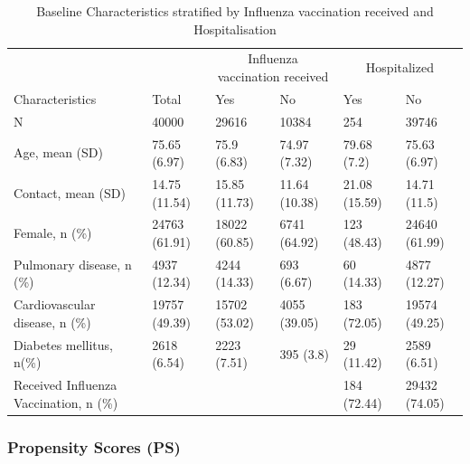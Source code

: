\documentclass[
]{article}
\begin{document}
\begin{table}[!h]

\caption{\label{tab:des}Baseline Characteristics stratified by Influenza vaccination received and Hospitalisation}
\centering
\begin{tabular}[t]{llllll}
\toprule
\multicolumn{1}{c}{ } & \multicolumn{1}{c}{ } & \multicolumn{2}{c}{Influenza vaccination received} & \multicolumn{2}{c}{Hospitalized} \\
\cmidrule(l{3pt}r{3pt}){3-4} \cmidrule(l{3pt}r{3pt}){5-6}
Characteristics & Total & Yes & No & Yes & No\\
\midrule
N & 40000 & 29616 & 10384 & 254 & 39746\\
Age, mean (SD) & 75.65 (6.97) & 75.9 (6.83) & 74.97 (7.32) & 79.68 (7.2) & 75.63 (6.97)\\
Contact, mean (SD) & 14.75 (11.54) & 15.85 (11.73) & 11.64 (10.38) & 21.08 (15.59) & 14.71 (11.5)\\
Female, n (\%) & 24763 (61.91) & 18022 (60.85) & 6741 (64.92) & 123 (48.43) & 24640 (61.99)\\
Pulmonary disease, n (\%) & 4937 (12.34) & 4244 (14.33) & 693 (6.67) & 60 (14.33) & 4877 (12.27)\\
\addlinespace
Cardiovascular disease, n (\%) & 19757 (49.39) & 15702 (53.02) & 4055 (39.05) & 183 (72.05) & 19574 (49.25)\\
Diabetes mellitus, n(\%) & 2618 (6.54) & 2223 (7.51) & 395 (3.8) & 29 (11.42) & 2589 (6.51)\\
Received Influenza Vaccination, n (\%) &  &  &  & 184 (72.44) & 29432 (74.05)\\
\bottomrule
\end{tabular}
\end{table}

\hypertarget{propensity-scores-ps}{%
\subsubsection{Propensity Scores (PS)}\label{propensity-scores-ps}}
\end{document}
